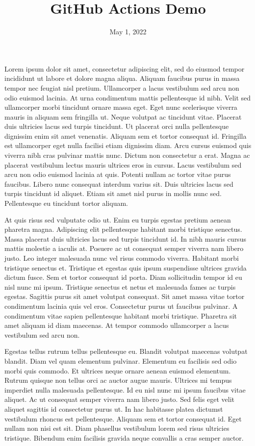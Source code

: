 \documentclass{article}
\title{GitHub Actions Demo}
\author{}
\date{May 1, 2022}
\begin{document}
\maketitle

Lorem ipsum dolor sit amet, consectetur adipiscing elit, sed do eiusmod tempor incididunt ut labore et dolore magna aliqua. Aliquam faucibus purus in massa tempor nec feugiat nisl pretium. Ullamcorper a lacus vestibulum sed arcu non odio euismod lacinia. At urna condimentum mattis pellentesque id nibh. Velit sed ullamcorper morbi tincidunt ornare massa eget. Eget nunc scelerisque viverra mauris in aliquam sem fringilla ut. Neque volutpat ac tincidunt vitae. Placerat duis ultricies lacus sed turpis tincidunt. Ut placerat orci nulla pellentesque dignissim enim sit amet venenatis. Aliquam sem et tortor consequat id. Fringilla est ullamcorper eget nulla facilisi etiam dignissim diam. Arcu cursus euismod quis viverra nibh cras pulvinar mattis nunc. Dictum non consectetur a erat. Magna ac placerat vestibulum lectus mauris ultrices eros in cursus. Lacus vestibulum sed arcu non odio euismod lacinia at quis. Potenti nullam ac tortor vitae purus faucibus. Libero nunc consequat interdum varius sit. Duis ultricies lacus sed turpis tincidunt id aliquet. Etiam sit amet nisl purus in mollis nunc sed. Pellentesque eu tincidunt tortor aliquam.


At quis risus sed vulputate odio ut. Enim eu turpis egestas pretium aenean pharetra magna. Adipiscing elit pellentesque habitant morbi tristique senectus. Massa placerat duis ultricies lacus sed turpis tincidunt id. In nibh mauris cursus mattis molestie a iaculis at. Posuere ac ut consequat semper viverra nam libero justo. Leo integer malesuada nunc vel risus commodo viverra. Habitant morbi tristique senectus et. Tristique et egestas quis ipsum suspendisse ultrices gravida dictum fusce. Sem et tortor consequat id porta. Diam sollicitudin tempor id eu nisl nunc mi ipsum. Tristique senectus et netus et malesuada fames ac turpis egestas. Sagittis purus sit amet volutpat consequat. Sit amet massa vitae tortor condimentum lacinia quis vel eros. Consectetur purus ut faucibus pulvinar. A condimentum vitae sapien pellentesque habitant morbi tristique. Pharetra sit amet aliquam id diam maecenas. At tempor commodo ullamcorper a lacus vestibulum sed arcu non.

Egestas tellus rutrum tellus pellentesque eu. Blandit volutpat maecenas volutpat blandit. Diam vel quam elementum pulvinar. Elementum eu facilisis sed odio morbi quis commodo. Et ultrices neque ornare aenean euismod elementum. Rutrum quisque non tellus orci ac auctor augue mauris. Ultrices mi tempus imperdiet nulla malesuada pellentesque. Id eu nisl nunc mi ipsum faucibus vitae aliquet. Ac ut consequat semper viverra nam libero justo. Sed felis eget velit aliquet sagittis id consectetur purus ut. In hac habitasse platea dictumst vestibulum rhoncus est pellentesque. Aliquam sem et tortor consequat id. Eget nullam non nisi est sit. Diam phasellus vestibulum lorem sed risus ultricies tristique. Bibendum enim facilisis gravida neque convallis a cras semper auctor.
\end{document}
